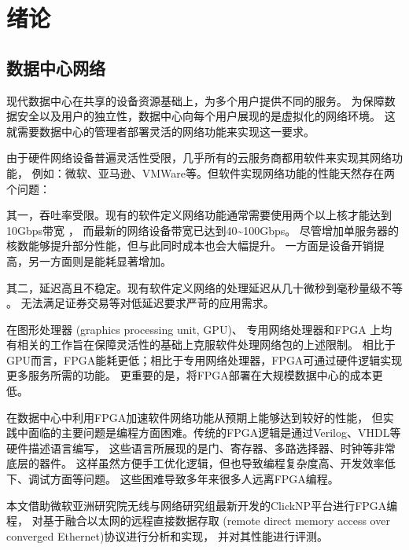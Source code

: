 \chapter{绪论}
\section{数据中心网络}
现代数据中心在共享的设备资源基础上，为多个用户提供不同的服务。
为保障数据安全以及用户的独立性，数据中心向每个用户展现的是虚拟化的网络环境。
这就需要数据中心的管理者部署灵活的网络功能来实现这一要求。

由于硬件网络设备普遍灵活性受限，几乎所有的云服务商都用软件来实现其网络功能，
例如：微软、亚马逊、VMWare等\cite{azure, 179731}。但软件实现网络功能的性能天然存在两个问题：

其一，吞吐率受限。现有的软件定义网络功能通常需要使用两个以上核才能达到10Gbps带宽
\cite{Martins:2014:CAN:2616448.2616491,180672}，
而最新的网络设备带宽已达到40\textasciitilde 100Gbps\cite{edr}。
尽管增加单服务器的核数能够提升部分性能，但与此同时成本也会大幅提升。
一方面是设备开销提高，另一方面则是能耗显著增加。

其二，延迟高且不稳定。现有软件定义网络的处理延迟从几十微秒到毫秒量级不等
\cite{Gandhi:2014:DCS:2619239.2626317, Martins:2014:CAN:2616448.2616491, Patel:2013:ACS:2486001.2486026}。
无法满足证券交易等对低延迟要求严苛的应用需求。

在图形处理器 (graphics processing unit, GPU)\cite{Han:2010:PGS:1851275.1851207}、
专用网络处理器\cite{cavium, netronome}和FPGA\cite{sigcomm2015keynote, Naous:2008:NRR:1397718.1397720}
上均有相关的工作旨在保障灵活性的基础上克服软件处理网络包的上述限制。
相比于GPU而言，FPGA能耗更低\cite{5681761, 5572788}；相比于专用网络处理器，FPGA可通过硬件逻辑实现更多服务所需的功能。
更重要的是，将FPGA部署在大规模数据中心的成本更低\cite{sigcomm2015keynote,6853195}。

在数据中心中利用FPGA加速软件网络功能从预期上能够达到较好的性能，
但实践中面临的主要问题是编程方面困难。传统的FPGA逻辑是通过Verilog、VHDL等硬件描述语言编写，
这些语言所展现的是门、寄存器、多路选择器、时钟等非常底层的器件。
这样虽然方便手工优化逻辑，但也导致编程复杂度高、开发效率低下、调试方面等问题。
这些困难导致多年来很多人远离FPGA编程\cite{Bacon:2013:FPM:2436256.2436271}。

本文借助微软亚洲研究院无线与网络研究组最新开发的ClickNP平台\cite{clicknp}进行FPGA编程，
对基于融合以太网的远程直接数据存取 (remote direct memory access over converged Ethernet)协议进行分析和实现，
并对其性能进行评测。

